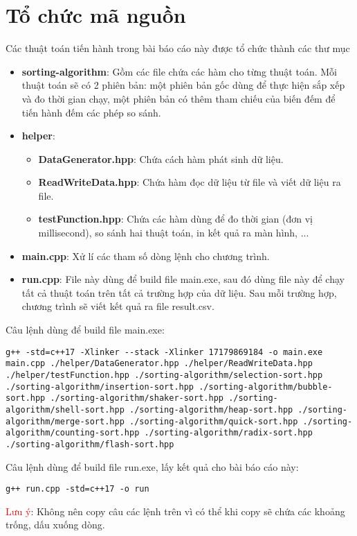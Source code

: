 \section{Tổ chức mã nguồn}

Các thuật toán tiến hành trong bài báo cáo này được tổ chức thành các thư mục
\begin{itemize}
    \item \textbf{sorting-algorithm}: Gồm các file chứa các hàm cho từng thuật toán. Mỗi thuật toán sẽ có 2 phiên bản: một phiên bản gốc dùng để thực hiện sắp xếp và đo thời gian chạy, một phiên bản có thêm tham chiếu của biến đếm để tiến hành đếm các phép so sánh. 
    \item \textbf{helper}:
    \begin{itemize}
        \item \textbf{DataGenerator.hpp}: Chứa cách hàm phát sinh dữ liệu.
        \item \textbf{ReadWriteData.hpp}: Chứa hàm đọc  dữ liệu từ file và viết dữ liệu ra file.
        \item \textbf{testFunction.hpp}: Chứa các hàm dùng để đo thời gian (đơn vị millisecond), so sánh hai thuật toán, in kết quả ra màn hình, ...
    \end{itemize}
    \item \textbf{main.cpp}: Xử lí các tham số dòng lệnh cho chương trình.
    \item \textbf{run.cpp}: File này dùng để build file main.exe, sau đó dùng file này để chạy tất cả thuật toán trên tất cả trường hợp của dữ liệu. Sau mỗi trường hợp, chương trình sẽ viết kết quả ra file result.csv.
\end{itemize}


Câu lệnh dùng để build file main.exe:
\begin{lstlisting}
g++ -std=c++17 -Xlinker --stack -Xlinker 17179869184 -o main.exe main.cpp ./helper/DataGenerator.hpp ./helper/ReadWriteData.hpp ./helper/testFunction.hpp ./sorting-algorithm/selection-sort.hpp ./sorting-algorithm/insertion-sort.hpp ./sorting-algorithm/bubble-sort.hpp ./sorting-algorithm/shaker-sort.hpp ./sorting-algorithm/shell-sort.hpp ./sorting-algorithm/heap-sort.hpp ./sorting-algorithm/merge-sort.hpp ./sorting-algorithm/quick-sort.hpp ./sorting-algorithm/counting-sort.hpp ./sorting-algorithm/radix-sort.hpp ./sorting-algorithm/flash-sort.hpp
\end{lstlisting}

Câu lệnh dùng để build file run.exe, lấy kết quả cho bài báo cáo này:
\begin{lstlisting}
g++ run.cpp -std=c++17 -o run
\end{lstlisting}

\textcolor{red}{Lưu ý}: Không nên copy câu các lệnh trên vì có thể khi copy sẽ chứa các khoảng trống, dấu xuống dòng.

